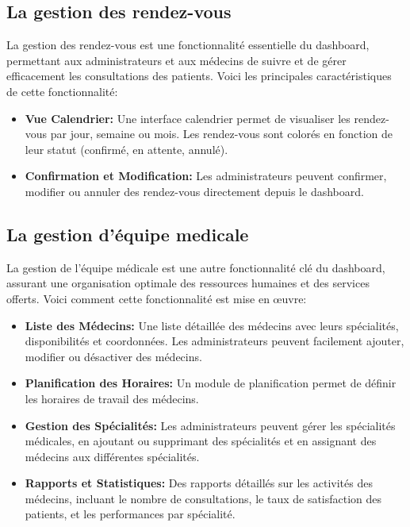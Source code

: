 \subsection{La gestion des rendez-vous}

\hspace {16pt}La gestion des rendez-vous est une fonctionnalité essentielle du dashboard, permettant aux administrateurs et aux médecins de suivre et de gérer efficacement les consultations des patients. Voici les principales caractéristiques de cette fonctionnalité:

\begin{itemize}
  \item \textbf{Vue Calendrier: }Une interface calendrier permet de visualiser les rendez-vous par jour, semaine ou mois. Les rendez-vous sont colorés en fonction de leur statut (confirmé, en attente, annulé).
  \item \textbf{Confirmation et Modification: }Les administrateurs peuvent confirmer, modifier ou annuler des rendez-vous directement depuis le dashboard.
\end{itemize}

\subsection{La gestion d'équipe medicale}

\hspace{16pt} La gestion de l’équipe médicale est une autre fonctionnalité clé du dashboard, assurant une organisation optimale des ressources humaines et des services offerts. Voici comment cette fonctionnalité est mise en œuvre:

\begin{itemize}
  \item \textbf{Liste des Médecins: }Une liste détaillée des médecins avec leurs spécialités, disponibilités et coordonnées. Les administrateurs peuvent facilement ajouter, modifier ou désactiver des médecins.
  \item \textbf{Planification des Horaires: }Un module de planification permet de définir les horaires de travail des médecins.
  \item \textbf{Gestion des Spécialités: }Les administrateurs peuvent gérer les spécialités médicales, en ajoutant ou supprimant des spécialités et en assignant des médecins aux différentes spécialités.
  \item \textbf{Rapports et Statistiques: }Des rapports détaillés sur les activités des médecins, incluant le nombre de consultations, le taux de satisfaction des patients, et les performances par spécialité.
\end{itemize}

